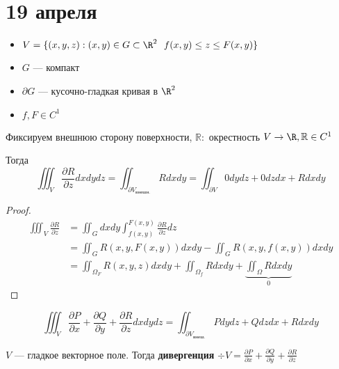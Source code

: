 \chapter{19 апреля}

\begin{theorem}\itemfix
    \begin{itemize}
        \item \(V = \{(x, y, z) : (x, y)\in G \subset \R^2 \ \ f(x, y) \leq z \leq F(x, y) \} \)
        \item \(G\) --- компакт
        \item \(\partial G\) --- кусочно-гладкая кривая в \(\R^2\)
        \item \(f, F\in C^1\)
    \end{itemize}

    Фиксируем внешнюю сторону поверхности, \(\mathbb R :\) окрестность \(V \to \R, \mathbb R \in C^1\)

    Тогда
    \[\iiint_V \frac{\partial R}{\partial z} dxdydz = \iint_{\partial V_\text{внешн.}} R dx dy = \iint_{\partial V} 0 dy dz + 0 dz dx + R dx dy\]
\end{theorem}
\begin{proof}

    \begin{align*}
        \iiint_V \frac{\partial R}{\partial z} & = \iint_G dx dy \int_{f(x, y)}^{F(x, y)} \frac{\partial R}{\partial z} dz                              \\
                                               & = \iint_G R(x, y, F(x, y)) dx dy - \iint_G R(x, y, f(x, y)) dx dy                                      \\
                                               & = \iint_{\Omega_F} R(x, y, z) dx dy + \iint_{\Omega_f} R dx dy + \underbrace{\iint_{\Omega} R dx dy}_0
    \end{align*}
\end{proof}

\begin{corollary}
    \[\iiint_V \frac{\partial P}{\partial x} + \frac{\partial Q}{\partial y} + \frac{\partial R}{\partial z} dx dy dz = \iint_{\partial V_{\text{внеш.}}} P dy dz + Q dz dx + R dx dy\]
\end{corollary}

\begin{definition}
    \(V\) --- гладкое векторное поле. Тогда \textbf{дивергенция} \(\div V = \frac{\partial P}{\partial x} + \frac{\partial Q}{\partial y} + \frac{\partial R}{\partial z}\)
\end{definition}

